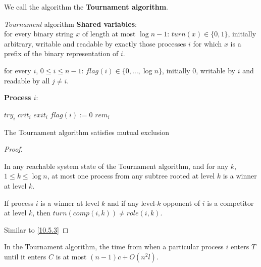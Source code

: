 \documentclass[11pt]{article}
\begin{document}
We call the algorithm the \textbf{Tournament algorithm}.

\begin{Block}{\textit{Tournament} algorithm}
\noindent \textbf{Shared variables}:\\
\noindent for every binary string \(x\) of length at most \(\log n-1\):
\indent \(turn(x)\in\{0,1\}\), initially arbitrary, writable and readable by exactly those processes
\(i\) for which \(x\) is a prefix of the binary representation of \(i\).

\noindent for every \(i\), \(0\le i\le n-1\):
\indent \(flag(i)\in\{0,\dots,\log n\}\), initially 0, writable by \(i\) and readable by all \(j\neq
        i\).

\noindent \textbf{Process \(i\)}:\\
\begin{algorithm}[H]
\KwRem
\(try_i\)\;
\(crit_i\)\;
\KwCrit
\(exit_i\)\;
\(flag(i):=0\)\;
\(rem_i\)\;
\end{algorithm}
\end{Block}

\begin{lemma}[]
The Tournament algorithm satisfies mutual exclusion
\end{lemma}

\begin{proof}
\begin{assertion}
\label{10.5.6}
In any reachable system state of the Tournament algorithm, and for any \(k\), \(1\le k\le\log n\), at
most one process from any subtree rooted at level \(k\) is a winner at level \(k\).
\end{assertion}

\begin{assertion}
\label{10.5.7}
If process \(i\) is a winner at level \(k\) and if any level-\(k\) opponent of \(i\) is a competitor
at level \(k\), then \(turn(comp(i,k))\neq role(i,k)\).
\end{assertion}

Similar to \ref{10.5.3}
\end{proof}

\begin{theorem}[]
In the Tournament algorithm, the time from when a particular process \(i\) enters \(T\) until it
enters \(C\) is at most \((n-1)c+O(n^2l)\).
\end{theorem}
\end{document}

